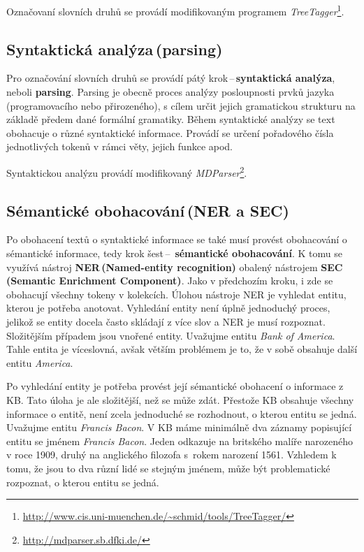Označovaní slovních druhů se provádí modifikovaným programem \emph{TreeTagger}\footnote{\href{http://www.cis.uni-muenchen.de/~schmid/tools/TreeTagger/}{http://www.cis.uni-muenchen.de/\textasciitilde schmid/tools/TreeTagger/}}.

\subsection*{Syntaktická analýza\,(parsing)}
Pro označování slovních druhů  se provádí pátý krok\,--\,\textbf{syntaktická analýza}, neboli \textbf{parsing}. Parsing je obecně proces analýzy posloupnosti prvků jazyka\,(programovacího nebo přirozeného), s cílem určit jejich gramatickou strukturu na základě předem dané formální gramatiky. Během syntaktické analýzy se text obohacuje o různé syntaktické informace. Provádí se určení pořadového čísla jednotlivých tokenů v rámci věty, jejich funkce apod. 

Syntaktickou analýzu provádí modifikovaný \emph{MDParser}\footnote{\href{http://mdparser.sb.dfki.de/}{http://mdparser.sb.dfki.de/}}.

\subsection*{Sémantické obohacování\,(NER a SEC)}
\label{nersec}
Po obohacení textů o syntaktické informace se také musí provést obohacování o sémantické informace, tedy krok šest\,--\, \textbf{sémantické obohacování}. K tomu se využívá nástroj \textbf{NER\,(Named-entity recognition)} obalený nástrojem \textbf{SEC\,(Semantic Enrichment Component)}. Jako v předchozím kroku, i zde se obohacují všechny tokeny v kolekcích. Úlohou nástroje NER je vyhledat entitu, kterou je potřeba anotovat. Vyhledání entity není úplně jednoduchý proces, jelikož se entity docela často skládají z více slov a NER je musí rozpoznat. Složitějším případem jsou vnořené entity. Uvažujme entitu  \emph{Bank of America}. Tahle entita je víceslovná, avšak větším problémem je to, že v sobě obsahuje další entitu \emph{America}.

Po vyhledání entity je potřeba provést její sémantické obohacení o informace z KB. Tato úloha je ale složitější, než se může zdát. Přestože KB obsahuje všechny informace o entitě, není zcela jednoduché se rozhodnout, o kterou entitu se jedná. Uvažujme entitu \emph{Francis Bacon}. V KB máme minimálně dva záznamy popisující entitu se jménem \emph{Francis Bacon}. Jeden odkazuje na britského malíře narozeného v roce 1909, druhý na anglického filozofa s~rokem narození 1561. Vzhledem k tomu, že jsou to dva různí lidé se stejným jménem, může být problematické rozpoznat, o kterou entitu se jedná.




